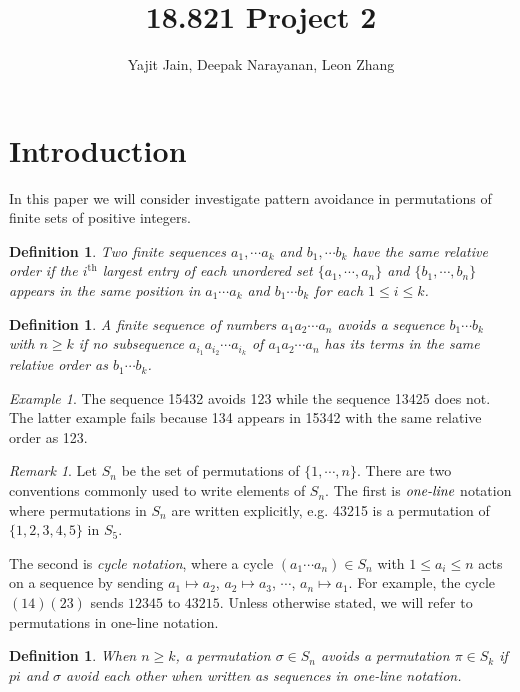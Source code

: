 \documentclass[11pt,letterpaper,twoside,english]{article}
\title{18.821 Project 2}
\author{Yajit Jain, Deepak Narayanan, Leon Zhang}
\theoremstyle{theorem}
\newtheorem{definition}[theorem]{Definition}
\theoremstyle{remark}
\newtheorem{remark}{Remark}
\newtheorem{example}{Example}
\begin{document}
\maketitle

\section{Introduction}

In this paper we will consider investigate pattern avoidance in permutations of finite sets of positive integers. 

\begin{definition}
Two finite sequences $a_1,\cdots a_k$ and $b_1,\cdots b_k$ have the same relative order if the $i^\text{th}$ largest entry of each unordered set $\{a_1,\cdots,a_n\}$ and $\{b_1,\cdots, b_n\}$ appears in the same position in $a_1\cdots a_k$ and $b_1\cdots b_k$ for each $1\le i\le k$. 
\end{definition}

\begin{definition}
A finite sequence of numbers $a_1a_2\cdots a_n$ avoids a sequence $b_1\cdots b_k$ with $n\ge k$ if no subsequence $a_{i_1}a_{i_2}\cdots a_{i_k}$ of $a_1a_2\cdots a_n$ has its terms in the same relative order as $b_1\cdots b_k$. 
\end{definition}

\begin{example}
The sequence 15432 avoids 123 while the sequence 13425 does not. The latter example fails because 134 appears in 15342 with the same relative order as 123. 
\end{example}


\begin{remark}
Let $S_n$ be the set of permutations of $\{1,\cdots, n\}$. There are two conventions commonly used to write elements of $S_n$. The first is $\emph{one-line}$ notation where permutations in $S_n$ are written explicitly, e.g. 43215 is a permutation of $\{1,2,3,4,5\}$ in $S_5$. 

The second is \emph{cycle notation}, where a cycle $(a_1\cdots a_n)\in S_n$ with $1\le a_i\le n$ acts on a sequence by sending $a_1\mapsto a_2$, $a_2\mapsto a_3$, $\cdots$, $a_n\mapsto a_1$. For example, the cycle $(14)(23)$ sends $12345$ to $43215$. Unless otherwise stated, we will refer to permutations in one-line notation. 
\end{remark}

\begin{definition} 
When $n\ge k$, a permutation $\sigma\in S_n$ avoids a permutation $\pi\in S_k$ if $pi$ and $\sigma$ avoid each other when written as sequences in one-line notation. 
\end{definition}
\end{document}
